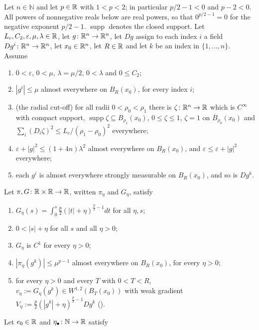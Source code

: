 \begin{helper}
Let $n\in\mathbb{N}$ and let $p\in\mathbb{R}$ with $1<p<2$; in particular
$p/2-1<0$ and $p-2<0$.  All powers of nonnegative reals below are real powers,
so that $0^{p/2-1}=0$ for the negative exponent $p/2-1$.
$\operatorname{supp}$ denotes the closed support.  Let
$L_c,C_2,\varepsilon,\mu,\lambda\in\mathbb{R}$, let $g\colon\mathbb{R}^n\to\mathbb{R}^n$, let $Dg$
assign to each index $i$ a field $Dg^i\colon\mathbb{R}^n\to\mathbb{R}^n$, let $x_0\in\mathbb{R}^n$, let
$R\in\mathbb{R}$ and let $k$ be an index in $\{1,\dots,n\}$.  Assume
\begin{enumerate}
\item[(H1)] $0<\varepsilon$, $0<\mu$, $\lambda=\mu/2$, $0<\lambda$ and
  $0\le C_2$;
\item[(H2)] $|g^i|\le\mu$ almost everywhere on $B_R(x_0)$, for every index $i$;
\item[(H3)] (the radial cut-off) for all radii $0<\rho_0<\rho_1$ there is
  $\zeta\colon\mathbb{R}^n\to\mathbb{R}$ which is $C^\infty$ with compact support,
  $\operatorname{supp}\zeta\subseteq B_{\rho_1}(x_0)$, $0\le\zeta\le1$,
  $\zeta=1$ on $\overline B_{\rho_0}(x_0)$ and
  $\sum_i(D_i\zeta)^2\le L_c/(\rho_1-\rho_0)^2$ everywhere;
\item[(H4)] $\varepsilon+|g|^2\le(1+4n)\lambda^2$ almost everywhere on
  $B_R(x_0)$, and $\varepsilon\le\varepsilon+|g|^2$ everywhere;
\item[(H5)] each $g^i$ is almost everywhere strongly measurable on $B_R(x_0)$,
  and so is $Dg^k$.
\end{enumerate}
Let $\pi,G\colon\mathbb{R}\times\mathbb{R}\to\mathbb{R}$, written $\pi_\eta$ and $G_\eta$, satisfy
\begin{enumerate}
\item[(H6)] $G_\eta(s)=\int_0^s\frac p2(|t|+\eta)^{\frac p2-1}dt$ for all
  $\eta,s$;
\item[(H7)] $0<|s|+\eta$ for all $s$ and all $\eta>0$;
\item[(H8)] $G_\eta$ is $C^1$ for every $\eta>0$;
\item[(H9)] $|\pi_\eta(g^k)|\le\mu^{p-1}$ almost everywhere on $B_R(x_0)$, for
  every $\eta>0$;
\item[(H10)] for every $\eta>0$ and every $T$ with $0<T<R$,
  $v_\eta:=G_\eta(g^k)\in W^{1,2}(B_T(x_0))$ with weak gradient
  $V_\eta:=\frac p2(|g^k|+\eta)^{\frac p2-1}Dg^k$ ().
\end{enumerate}
Let $e_0\in\mathbb{R}$ and $\eta_\bullet\colon\mathbb{N}\to\mathbb{R}$ satisfy
\begin{enumerate}

\end{enumerate}
\end{helper}
